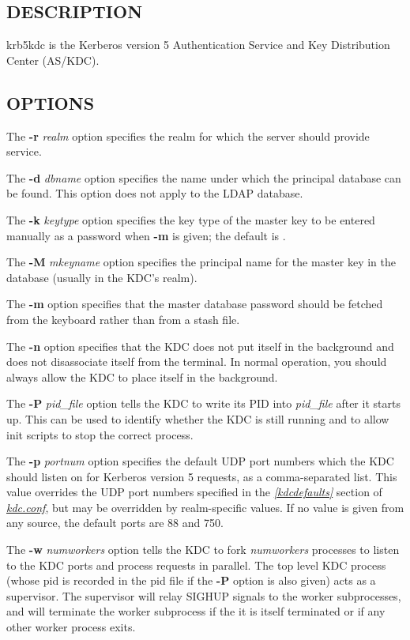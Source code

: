 \documentclass[letterpaper,10pt,english]{sphinxmanual}
\begin{document}
\subsection{DESCRIPTION}
\label{admin/admin_commands/krb5kdc:description}
krb5kdc is the Kerberos version 5 Authentication Service and Key
Distribution Center (AS/KDC).


\subsection{OPTIONS}
\label{admin/admin_commands/krb5kdc:options}
The \textbf{-r} \emph{realm} option specifies the realm for which the server
should provide service.

The \textbf{-d} \emph{dbname} option specifies the name under which the
principal database can be found.  This option does not apply to the
LDAP database.

The \textbf{-k} \emph{keytype} option specifies the key type of the master key
to be entered manually as a password when \textbf{-m} is given; the default
is .

The \textbf{-M} \emph{mkeyname} option specifies the principal name for the
master key in the database (usually  in the KDC's realm).

The \textbf{-m} option specifies that the master database password should
be fetched from the keyboard rather than from a stash file.

The \textbf{-n} option specifies that the KDC does not put itself in the
background and does not disassociate itself from the terminal.  In
normal operation, you should always allow the KDC to place itself in
the background.

The \textbf{-P} \emph{pid\_file} option tells the KDC to write its PID into
\emph{pid\_file} after it starts up.  This can be used to identify whether
the KDC is still running and to allow init scripts to stop the correct
process.

The \textbf{-p} \emph{portnum} option specifies the default UDP port numbers
which the KDC should listen on for Kerberos version 5 requests, as a
comma-separated list.  This value overrides the UDP port numbers
specified in the {\hyperref[admin/conf_files/kdc_conf:kdcdefaults]{\emph{{[}kdcdefaults{]}}}} section of {\hyperref[admin/conf_files/kdc_conf:kdc-conf-5]{\emph{kdc.conf}}}, but
may be overridden by realm-specific values.  If no value is given from
any source, the default ports are 88 and 750.

The \textbf{-w} \emph{numworkers} option tells the KDC to fork \emph{numworkers}
processes to listen to the KDC ports and process requests in parallel.
The top level KDC process (whose pid is recorded in the pid file if
the \textbf{-P} option is also given) acts as a supervisor.  The supervisor
will relay SIGHUP signals to the worker subprocesses, and will
terminate the worker subprocess if the it is itself terminated or if
any other worker process exits.
\end{document}

